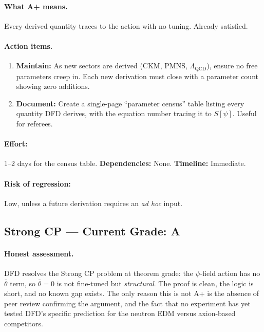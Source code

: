 \documentclass[11pt,a4paper]{article}
\begin{document}
\paragraph{What A+ means.}
Every derived quantity traces to the action with no tuning. Already satisfied.

\paragraph{Action items.}
\begin{enumerate}
    \item \textbf{Maintain:} As new sectors are derived (CKM, PMNS, $\Lambda_{\text{QCD}}$), ensure no free parameters creep in. Each new derivation must close with a parameter count showing zero additions.
    \item \textbf{Document:} Create a single-page ``parameter census'' table listing every quantity DFD derives, with the equation number tracing it to $S[\psi]$. Useful for referees.
\end{enumerate}

\paragraph{Effort:} 1--2 days for the census table. \quad \textbf{Dependencies:} None. \quad \textbf{Timeline:} Immediate.

\paragraph{Risk of regression:} Low, unless a future derivation requires an \emph{ad hoc} input.

\subsection{Strong CP --- Current Grade: A}

\paragraph{Honest assessment.}
DFD resolves the Strong CP problem at theorem grade: the $\psi$-field action has no $\bar{\theta}$ term, so $\bar{\theta} = 0$ is not fine-tuned but \emph{structural}. The proof is clean, the logic is short, and no known gap exists. The only reason this is not A+ is the absence of peer review confirming the argument, and the fact that no experiment has yet tested DFD's specific prediction for the neutron EDM versus axion-based competitors.
\end{document}
